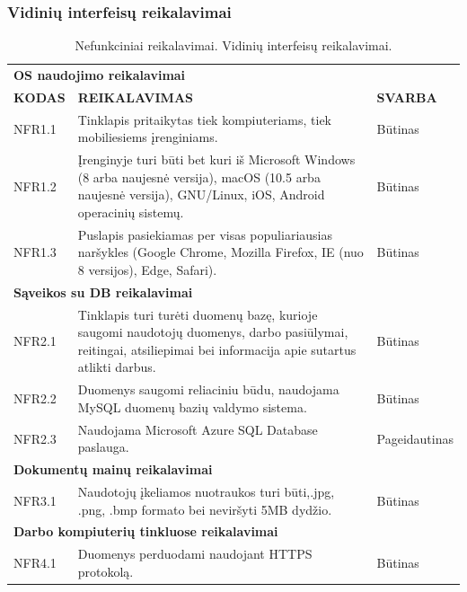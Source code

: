 \documentclass{VUMIFPSkursinis}
\begin{document}
\subsubsection{Vidinių interfeisų reikalavimai}
\begin{table}[H]
\caption{Nefunkciniai reikalavimai. Vidinių interfeisų reikalavimai.}
\centering
\normalsize
\begin{tabular}{|p{2cm}|p{10cm}|p{3cm}|}
\hline
\rowcolor{gray!30}
\multicolumn{3}{|l|}{\centering{\textbf{Vidinių interfeisų reikalavimai}}} \\ \hline
\multicolumn{3}{|l|}{\textbf{OS naudojimo reikalavimai}} \\ \hline
\textbf{KODAS}& \multicolumn{1}{m{10cm}|}{\textbf{REIKALAVIMAS}} & \textbf{SVARBA} \\ \hline
NFR1.1 & \multicolumn{1}{m{10cm}|}{Tinklapis pritaikytas tiek kompiuteriams, tiek mobiliesiems įrenginiams.} & Būtinas \\ \hline
NFR1.2 & \multicolumn{1}{m{10cm}|}{Įrenginyje turi būti bet kuri iš Microsoft Windows (8 arba naujesnė versija), macOS (10.5 arba naujesnė versija), GNU/Linux, iOS, Android operacinių sistemų.} & Būtinas \\ \hline
NFR1.3 & \multicolumn{1}{m{10cm}|}{Puslapis pasiekiamas per visas populiariausias naršykles (Google Chrome, Mozilla Firefox, IE (nuo 8 versijos), Edge, Safari).} & Būtinas \\ \hline
\multicolumn{3}{|l|}{\textbf{Sąveikos su DB reikalavimai}} \\ \hline
NFR2.1 & \multicolumn{1}{m{10cm}|}{Tinklapis turi turėti duomenų bazę, kurioje saugomi naudotojų duomenys, darbo pasiūlymai, reitingai, atsiliepimai bei informacija apie sutartus atlikti darbus.} & Būtinas \\ \hline
NFR2.2 & \multicolumn{1}{m{10cm}|}{Duomenys saugomi reliaciniu būdu, naudojama MySQL duomenų bazių valdymo sistema.} & Būtinas \\ \hline
NFR2.3 & \multicolumn{1}{m{10cm}|}{Naudojama Microsoft Azure SQL Database paslauga.} & Pageidautinas \\ \hline
\multicolumn{3}{|l|}{\textbf{Dokumentų mainų reikalavimai}} \\ \hline
NFR3.1 & \multicolumn{1}{m{10cm}|}{Naudotojų įkeliamos nuotraukos turi būti,.jpg, .png, .bmp formato bei neviršyti 5MB dydžio.} & Būtinas \\ \hline
\multicolumn{3}{|m{10cm}|}{\textbf{Darbo kompiuterių tinkluose reikalavimai}} \\ \hline
NFR4.1 & \multicolumn{1}{m{10cm}|}{Duomenys perduodami naudojant HTTPS protokolą.} & Būtinas \\ \hline

\end{tabular}
\end{table}
\end{document}
